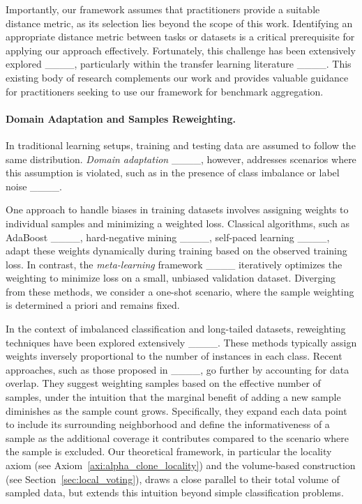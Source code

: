  
Importantly, our framework assumes that practitioners provide a suitable distance metric, as its selection lies beyond the scope of this work.
Identifying an appropriate distance metric between tasks or datasets is a critical prerequisite for applying our approach effectively. 
Fortunately, this challenge has been extensively explored 
____, particularly within the transfer learning literature ____. 
This existing body of research complements our work and provides valuable guidance for practitioners seeking to use our framework for benchmark aggregation.








\paragraph{Domain Adaptation and Samples Reweighting.}

In traditional learning setups, training and testing data are assumed to follow the same distribution. \emph{Domain adaptation} ____, however, addresses scenarios where this assumption is violated, such as in the presence of class imbalance or label noise ____.

One approach to handle biases in training datasets involves assigning weights to individual samples and minimizing a weighted loss. Classical algorithms, such as AdaBoost ____, hard-negative mining ____,
self-paced learning ____, adapt these weights dynamically during training based on the observed training loss. In contrast, the \emph{meta-learning} framework ____
%
iteratively optimizes the weighting 
to minimize loss on a small, unbiased validation dataset. Diverging from these methods, we consider a one-shot scenario, where the sample weighting is determined a priori and remains fixed.


In the context of imbalanced classification and long-tailed datasets, reweighting techniques have been explored extensively ____. These methods typically assign weights inversely proportional to the number of instances in each class. Recent approaches, such as those proposed in ____, go further by accounting for data overlap. They suggest weighting samples based on the effective number of samples, under the intuition that the marginal benefit of adding a new sample diminishes as the sample count grows. Specifically, they expand each data point to include its surrounding neighborhood and define the informativeness of a sample as the additional coverage %
it contributes compared to the scenario where the sample is excluded.
Our theoretical framework, in particular the locality axiom (see Axiom~\ref{axi:alpha_clone_locality}) and the volume-based construction 
(see Section~\ref{sec:local_voting}), draws a close parallel to their total volume of sampled data, but extends this intuition beyond simple classification problems.


